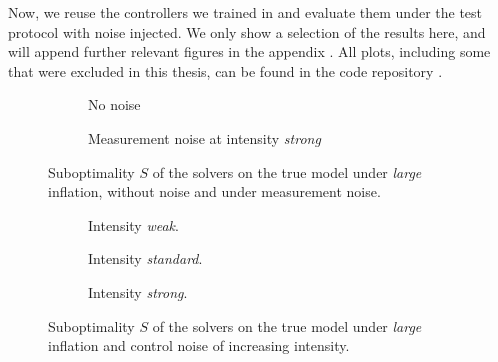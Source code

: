 Now, we reuse the controllers we trained in  and evaluate them under the test protocol
with noise injected. We only show a selection of the results here, and will append
further relevant figures in the appendix . All plots, including some that were excluded in this thesis, can be
found in the code repository .

\begin{figure}[htbp]
  \centering
  \begin{subfigure}[t]{0.49\linewidth}
    \centering
    \caption{No noise}
    \label{fig:ch4-true-noise-large-clean}
  \end{subfigure}\hfill
  \begin{subfigure}[t]{0.49\linewidth}
    \centering
    \caption{Measurement noise at intensity \emph{strong}}
    \label{fig:ch4-true-noise-large-measurement-strong}
  \end{subfigure}
  \caption{Suboptimality $S$ of the solvers on the true model under \emph{large} inflation,
    without noise and under measurement noise.}
  \label{fig:ch4-true-noise-large-measurement}
\end{figure}



\begin{figure}[htbp]
  \centering
  \begin{subfigure}[t]{0.49\linewidth}
    \centering
    \caption{Intensity \emph{weak}.}
    \label{fig:ch4-true-noise-large-control-weak}
  \end{subfigure}\hfill
  \begin{subfigure}[t]{0.49\linewidth}
    \centering
    \caption{Intensity \emph{standard}.}
    \label{fig:ch4-true-noise-large-control-standard}
  \end{subfigure}

  \medskip
  \begin{subfigure}[t]{0.49\linewidth}
    \centering
    \caption{Intensity \emph{strong}.}
    \label{fig:ch4-true-noise-large-control-strong}
  \end{subfigure}
  \caption{Suboptimality $S$ of the solvers on the true model under \emph{large} inflation
    and control noise of increasing intensity.}
  \label{fig:ch4-true-noise-large-control}
\end{figure}


